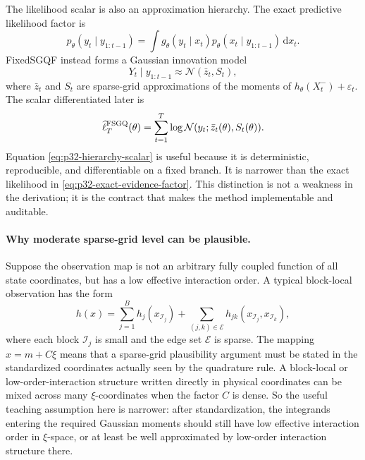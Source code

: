 \documentclass[11pt]{article}
\numberwithin{equation}{section}
\newcommand{\N}{\mathcal N}
\newcommand{\dd}{\,\mathrm d}
\newcommand{\ellhat}{\widehat\ell}
\begin{document}
The likelihood scalar is also an approximation hierarchy.  The exact
predictive likelihood factor is
\begin{equation}
  p_\theta(y_t\mid y_{1:t-1})
  =
  \int g_\theta(y_t\mid x_t)
  p_\theta(x_t\mid y_{1:t-1})\dd x_t.
  \label{eq:p32-exact-evidence-factor}
\end{equation}
FixedSGQF instead forms a Gaussian innovation model
\begin{equation}
  Y_t\mid y_{1:t-1}
  \approx
  \N(\bar z_t,S_t),
  \label{eq:p32-gaussian-innovation-model}
\end{equation}
where \(\bar z_t\) and \(S_t\) are sparse-grid approximations of the moments of
\(h_\theta(X_t^-)+\varepsilon_t\).  The scalar differentiated later is
\begin{equation}
  \ellhat_T^{\rm FSGQ}(\theta)
  =
  \sum_{t=1}^T
  \log \N(y_t;\bar z_t(\theta),S_t(\theta)).
  \label{eq:p32-hierarchy-scalar}
\end{equation}
Equation \eqref{eq:p32-hierarchy-scalar} is useful because it is deterministic,
reproducible, and differentiable on a fixed branch.  It is narrower than the
exact likelihood in \eqref{eq:p32-exact-evidence-factor}.  This distinction is
not a weakness in the derivation; it is the contract that makes the method
implementable and auditable.

\paragraph{Why moderate sparse-grid level can be plausible.}
Suppose the observation map is not an arbitrary fully coupled function of all
state coordinates, but has a low effective interaction order.  A typical
block-local observation has the form
\begin{equation}
  h(x)
  =
  \sum_{j=1}^{B} h_j(x_{\mathcal I_j})
  +\sum_{(j,k)\in\mathcal E} h_{jk}(x_{\mathcal I_j},x_{\mathcal I_k}),
  \label{eq:p32-low-interaction-map}
\end{equation}
where each block \(\mathcal I_j\) is small and the edge set \(\mathcal E\) is
sparse.  
The mapping \(x=m+C\xi\) means that a sparse-grid plausibility argument must be
stated in the standardized coordinates actually seen by the quadrature rule.  A
block-local or low-order-interaction structure written directly in physical
coordinates can be mixed across many \(\xi\)-coordinates when the factor \(C\) is
dense.  So the useful teaching assumption here is narrower: after
standardization, the integrands entering the required Gaussian moments should
still have low effective interaction order in \(\xi\)-space, or at least be well
approximated by low-order interaction structure there.
\end{document}
